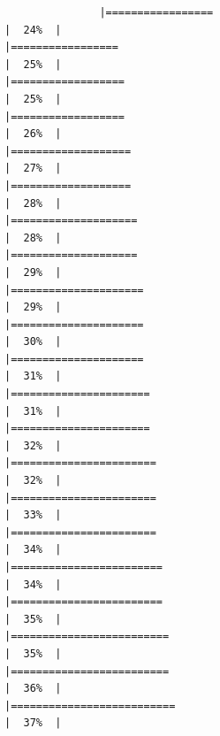 \documentclass[
]{article}
\begin{document}
\begin{verbatim}
               |=================                                                     |  24%  |                                                                              |=================                                                     |  25%  |                                                                              |==================                                                    |  25%  |                                                                              |==================                                                    |  26%  |                                                                              |===================                                                   |  27%  |                                                                              |===================                                                   |  28%  |                                                                              |====================                                                  |  28%  |                                                                              |====================                                                  |  29%  |                                                                              |=====================                                                 |  29%  |                                                                              |=====================                                                 |  30%  |                                                                              |=====================                                                 |  31%  |                                                                              |======================                                                |  31%  |                                                                              |======================                                                |  32%  |                                                                              |=======================                                               |  32%  |                                                                              |=======================                                               |  33%  |                                                                              |=======================                                               |  34%  |                                                                              |========================                                              |  34%  |                                                                              |========================                                              |  35%  |                                                                              |=========================                                             |  35%  |                                                                              |=========================                                             |  36%  |                                                                              |==========================                                            |  37%  |                                                                
\end{verbatim}
\end{document}
